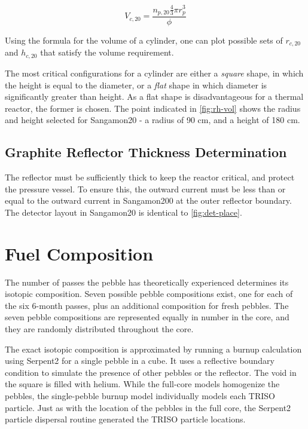 \begin{equation}
V_{c,20} = \frac{ n_{p,20}\frac{4}{3}\pi r_{p}^3 }{ \phi }
\end{equation}

Using the formula for the volume of a cylinder, one can plot possible sets of $r_{c,20}$ and $h_{c,20}$ that satisfy the volume requirement.



The most critical configurations for a cylinder are either a \emph{square} shape, in which the height is equal to the diameter, or a \emph{flat} shape in which diameter is significantly greater than height.  As a flat shape is disadvantageous for a thermal reactor, the former is chosen.  The point indicated in \ref{fig:rh-vol} shows the radius and height selected for Sangamon20 - a radius of 90 cm, and a height of 180 cm.

\subsection{Graphite Reflector Thickness Determination}

The reflector must be sufficiently thick to keep the reactor critical, and protect the pressure vessel.  To ensure this, the outward current must be less than or equal to the outward current in Sangamon200 at the outer reflector boundary.  The detector layout in Sangamon20 is identical to \ref{fig:det-place}.

\section{Fuel Composition}

The number of passes the pebble has theoretically experienced determines its isotopic composition.  Seven possible pebble compositions exist, one for each of the six 6-month passes, plus an additional composition for fresh pebbles.  The seven pebble compositions are represented equally in number in the core, and they are randomly distributed throughout the core.

The exact isotopic composition is approximated by running a burnup calculation using Serpent2 for a single pebble in a cube.  It uses a reflective boundary condition to simulate the presence of other pebbles or the reflector.  The void in the square is filled with helium.  While the full-core models homogenize the pebbles, the single-pebble burnup model individually models each TRISO particle.  Just as with the location of the pebbles in the full core, the Serpent2 particle dispersal routine generated the TRISO particle locations.

